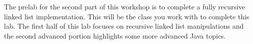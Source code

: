 \documentclass[../../main.tex]{subfiles}
\begin{document}
The prelab for the second part of this workshop is to complete a fully
recursive linked list implementation. This will be the class you work
with to complete this lab. The first half of this lab focuses on
recursive linked list manipulations and the second advanced portion
highlights some more advanced Java topics.
\end{document}
